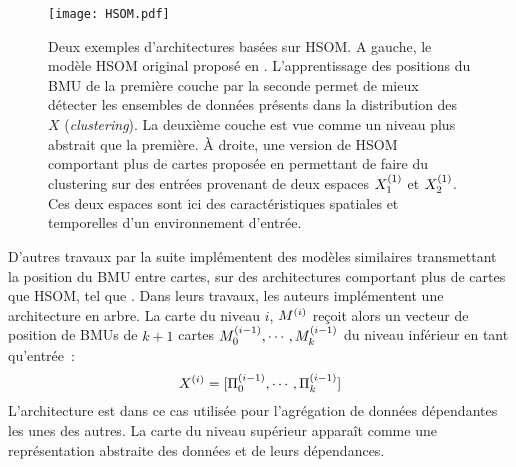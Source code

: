 \documentclass[../main]{subfiles}
\begin{document}
\begin{figure}[t]
    \centering
    \texttt{[image: HSOM.pdf]}
    \caption{Deux exemples d'architectures basées sur HSOM. A gauche, le modèle HSOM original proposé en \cite{lampinen_clustering_1992}. L'apprentissage des positions du BMU de la première couche par la seconde permet de mieux détecter les ensembles de données présents dans la distribution des $X$ (\emph{clustering}).
    La deuxième couche est vue comme un niveau plus abstrait que la première. 
    \`A droite, une version de HSOM comportant plus de cartes proposée en \cite{hagenauer_hierarchical_2013} permettant de faire du clustering sur des entrées provenant de deux espaces $X_1^{({1})}$ et $X_2^{({1})}$. Ces deux espaces sont ici des caractéristiques spatiales et temporelles d'un environnement d'entrée.
    \label{fig:hsom}}
\end{figure}


D'autres travaux par la suite implémentent des modèles similaires transmettant la position du BMU entre cartes, sur des architectures comportant plus de cartes que HSOM, tel que \cite{hagenauer_hierarchical_2013, Paplinski2005MultimodalFS}.
Dans leurs travaux, les auteurs implémentent une architecture en arbre. La carte du niveau $i$, $M^{({i})}$ reçoit alors un vecteur de position de BMUs de $k+1$ cartes $M_0^{({i-1})}, \cdots, M_k^{({i-1})}$  du niveau inférieur en tant qu'entrée~:
$$ X^{({i})} = [\Pi_0^{({i-1})}, \cdots, \Pi_k^{({i-1})}]$$
L'architecture est dans ce cas utilisée pour l'agrégation de données dépendantes les unes des autres.
La carte du niveau supérieur apparaît comme une représentation abstraite des données et de leurs dépendances.
\end{document}
